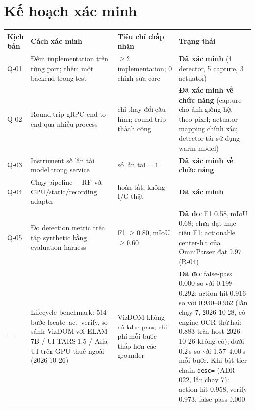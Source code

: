 \documentclass[11pt,a4paper]{report}
\newcommand{\code}[1]{\texttt{#1}}
\begin{document}
\section{Kế hoạch xác minh}
\begin{longtable}{@{}p{2.0cm}p{5.4cm}p{4.4cm}p{2.2cm}@{}}
\toprule
\textbf{Kịch bản} & \textbf{Cách xác minh} & \textbf{Tiêu chí chấp nhận} & \textbf{Trạng thái} \\
\midrule
\endhead
Q-01 & Đếm implementation trên từng port; thêm một backend trong test & $\geq 2$ implementation; 0 chỉnh sửa core & \textbf{Đã xác minh} (4 detector, 5 capture, 3 actuator) \\
Q-02 & Round-trip gRPC end-to-end qua nhiều process & chỉ thay đổi cấu hình; round-trip thành công & \textbf{Đã xác minh về chức năng} (capture cho ảnh giống hệt theo pixel; actuator mapping chính xác; detector tái sử dụng warm model) \\
Q-03 & Instrument số lần tải model trong service & số lần tải = 1 & \textbf{Đã xác minh về chức năng} \\
Q-04 & Chạy pipeline + RF với CPU/static/recording adapter & hoàn tất, không I/O thật & \textbf{Đã xác minh} \\
Q-05 & Đo detection metric trên tập synthetic bằng evaluation harness & F1 $\geq 0.80$, mIoU $\geq 0.60$ & \textbf{Đã đo}: F1 0.58, mIoU 0.68; chưa đạt mục tiêu F1; actionable center-hit của OmniParser đạt 0.97 (R-04) \\
--- & Lifecycle benchmark: 514 bước locate--act--verify, so sánh VizDOM với ELAM-7B / UI-TARS-1.5 / Aria-UI trên GPU thuê ngoài (2026-10-26) & VizDOM không có false-pass; chi phí mỗi bước thấp hơn các grounder & \textbf{Đã đo}: false-pass 0.000 so với 0.199--0.292; action-hit 0.916 so với 0.930--0.962 (lần chạy 7, 2026-10-28, có engine OCR thứ hai; 0.883 trên host 2026-10-26 không có); dưới 0.2\,s so với 1.57--4.00\,s mỗi bước. Khi bật tier chain \code{desc=} (ADR-022, lần chạy 7): action-hit 0.958, verify 0.973, false-pass 0.000 \\
\bottomrule
\end{longtable}

\end{document}
